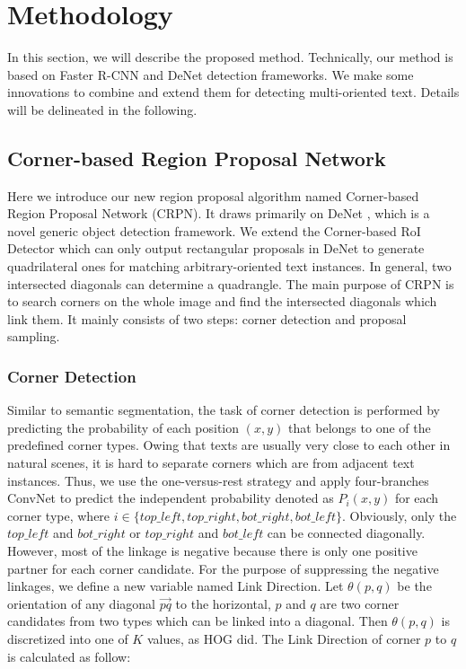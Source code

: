 \documentclass[3p, times]{elsarticle}
\begin{document}
\section{Methodology}
In this section, we will describe the proposed method. Technically, our method is based on Faster R-CNN \cite{FASTERRCNN2015NIPS} and DeNet \cite{DENET2017ARXIV} detection frameworks. We make some innovations to combine and extend them for detecting multi-oriented text. Details will be delineated in the following.


\subsection{Corner-based Region Proposal Network}
Here we introduce our new region proposal algorithm named Corner-based Region Proposal Network (CRPN). It draws primarily on DeNet \cite{DENET2017ARXIV}, which is a novel generic object detection framework. We extend the Corner-based RoI Detector which can only output rectangular proposals in DeNet to generate quadrilateral ones for matching arbitrary-oriented text instances. In general, two intersected diagonals can determine a quadrangle. The main purpose of CRPN is to search corners on the whole image and find the intersected diagonals which link them. It mainly consists of two steps:  corner detection and proposal sampling.


\subsubsection{Corner Detection}
Similar to semantic segmentation, the task of corner detection is performed by predicting the probability of each position $(x,y)$ that belongs to one of the predefined corner types. Owing that texts are usually very close to each other in natural scenes, it is hard to separate corners which are from adjacent text instances. Thus, we use the one-versus-rest strategy and apply four-branches ConvNet to predict the independent probability denoted as $P_i(x,y)$ for each corner type, where $i\in\{top\_left,top\_right,bot\_right,bot\_left\}$. Obviously, only the $top\_left$ and $bot\_right$ or $top\_right$ and $bot\_left$ can be connected diagonally. However, most of the linkage is negative because there is only one positive partner for each corner candidate. For the purpose of suppressing the negative linkages, we define a new variable named Link Direction. Let $\theta(p,q)$ be the orientation of any diagonal $\overrightarrow{pq}$ to the horizontal, $p$ and $q$ are two corner candidates from two types which can be linked into a diagonal. Then $\theta(p,q)$ is discretized into one of $K$ values, as HOG \cite{HOG2005CVPR} did. The Link Direction of corner $p$ to $q$ is calculated as follow:
\end{document}

